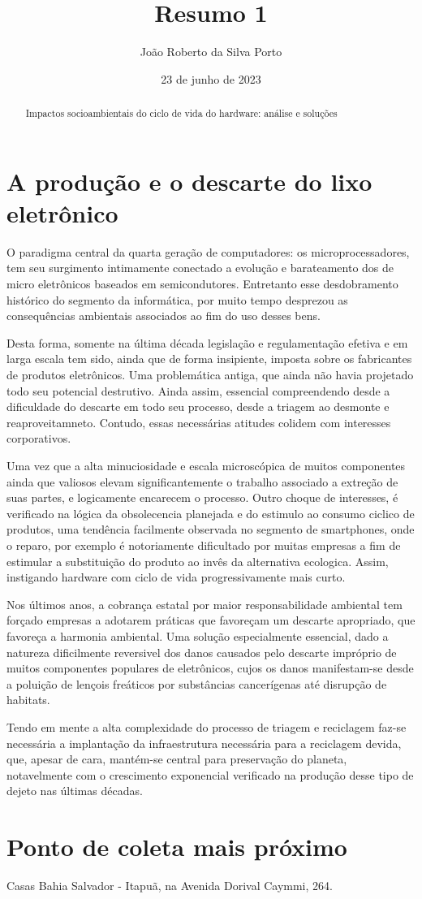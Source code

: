 \documentclass[12pt]{article}
\begin{document}
       
\title{Resumo 1}
\date{23 de junho de 2023}
\author{João Roberto da Silva Porto}

\begin{abstract}
Impactos socioambientais do ciclo de vida do hardware: análise e soluções 
\end{abstract}

\section*{A produção e o descarte do lixo eletrônico}
O paradigma central da quarta geração de computadores: os microprocessadores, tem seu surgimento intimamente conectado a evolução e barateamento dos de micro eletrônicos baseados em semicondutores.
Entretanto esse desdobramento histórico do segmento da informática, por muito tempo desprezou as consequências ambientais associados ao fim do uso desses bens. 

Desta forma, somente na última década legislação e regulamentação efetiva e em larga escala tem sido, ainda que de forma insipiente, imposta sobre os fabricantes de produtos eletrônicos. Uma problemática antiga,
que ainda não havia projetado todo seu potencial destrutivo. Ainda assim, essencial compreendendo desde a dificuldade do descarte em todo seu processo, desde a triagem ao desmonte e reaproveitamneto.
 Contudo, essas necessárias atitudes colidem com interesses corporativos.

 Uma vez que a alta minuciosidade e escala microscópica de muitos componentes ainda que valiosos elevam significantemente o trabalho associado a extreção de suas partes, e logicamente encarecem o processo.
 Outro choque de interesses, é verificado na lógica da obsolecencia planejada e do estimulo ao consumo ciclico de produtos, uma tendência facilmente observada no segmento de smartphones, onde o reparo, por exemplo é notoriamente dificultado por muitas empresas a fim de estimular a substituição do produto ao invês da
 alternativa ecologica. Assim, instigando hardware com ciclo de vida progressivamente mais curto. 

 Nos últimos anos, a cobrança estatal por maior responsabilidade ambiental tem forçado empresas a adotarem práticas que favoreçam um descarte apropriado, que favoreça a harmonia ambiental. Uma solução especialmente essencial, dado a natureza dificilmente reversivel dos danos causados pelo descarte impróprio de muitos componentes populares de eletrônicos, cujos os danos 
manifestam-se desde a poluição de lençois freáticos por substâncias cancerígenas até disrupção de habitats.

 Tendo em mente a alta complexidade do processo de triagem e reciclagem faz-se necessária a implantação da infraestrutura necessária para a reciclagem devida, 
 que, apesar de cara, mantém-se central para preservação do planeta, notavelmente com o crescimento exponencial verificado na produção desse tipo de dejeto nas últimas décadas.

\section*{Ponto de coleta mais próximo}
Casas Bahia Salvador - Itapuã, na Avenida Dorival Caymmi, 264.
\end{document}
